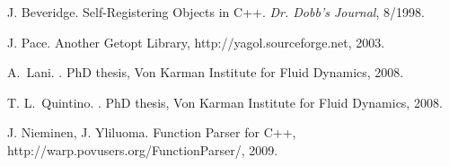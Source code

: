 \documentclass[11pt]{article}
\begin{document}
\begin{thebibliography}{00}
  
  J. Beveridge. Self-Registering Objects in C++. {\em Dr. Dobb's
    Journal}, 8/1998.
  
  J. Pace. Another Getopt Library, http://yagol.sourceforge.net, 2003.
  
  A.~Lani. .
  \newblock PhD thesis, Von Karman Institute for Fluid Dynamics, 2008.
  
  T. L.~Quintino. .
  \newblock PhD thesis,  Von Karman Institute for Fluid Dynamics, 2008.
  
  J. Nieminen, J. Yliluoma. Function Parser for C++, 
  http://warp.povusers.org/FunctionParser/, 2009.
  
\end{thebibliography}
\end{document}
